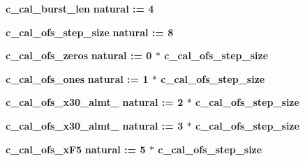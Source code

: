\begin{DoxyCompactItemize}
\item 
{\bf c\+\_\+cal\+\_\+burst\+\_\+len} {\bfseries \textcolor{comment}{natural}\textcolor{vhdlchar}{ }\textcolor{vhdlchar}{ }\textcolor{vhdlchar}{\+:}\textcolor{vhdlchar}{=}\textcolor{vhdlchar}{ }\textcolor{vhdlchar}{ } \textcolor{vhdldigit}{4} \textcolor{vhdlchar}{ }} 
\item 
{\bf c\+\_\+cal\+\_\+ofs\+\_\+step\+\_\+size} {\bfseries \textcolor{comment}{natural}\textcolor{vhdlchar}{ }\textcolor{vhdlchar}{ }\textcolor{vhdlchar}{\+:}\textcolor{vhdlchar}{=}\textcolor{vhdlchar}{ }\textcolor{vhdlchar}{ } \textcolor{vhdldigit}{8} \textcolor{vhdlchar}{ }} 
\item 
{\bf c\+\_\+cal\+\_\+ofs\+\_\+zeros} {\bfseries \textcolor{comment}{natural}\textcolor{vhdlchar}{ }\textcolor{vhdlchar}{ }\textcolor{vhdlchar}{\+:}\textcolor{vhdlchar}{=}\textcolor{vhdlchar}{ }\textcolor{vhdlchar}{ } \textcolor{vhdldigit}{0} \textcolor{vhdlchar}{$\ast$}\textcolor{vhdlchar}{ }\textcolor{vhdlchar}{ }\textcolor{vhdlchar}{ }{\bfseries {\bf c\+\_\+cal\+\_\+ofs\+\_\+step\+\_\+size}} \textcolor{vhdlchar}{ }} 
\item 
{\bf c\+\_\+cal\+\_\+ofs\+\_\+ones} {\bfseries \textcolor{comment}{natural}\textcolor{vhdlchar}{ }\textcolor{vhdlchar}{ }\textcolor{vhdlchar}{\+:}\textcolor{vhdlchar}{=}\textcolor{vhdlchar}{ }\textcolor{vhdlchar}{ } \textcolor{vhdldigit}{1} \textcolor{vhdlchar}{$\ast$}\textcolor{vhdlchar}{ }\textcolor{vhdlchar}{ }\textcolor{vhdlchar}{ }{\bfseries {\bf c\+\_\+cal\+\_\+ofs\+\_\+step\+\_\+size}} \textcolor{vhdlchar}{ }} 
\item 
{\bf c\+\_\+cal\+\_\+ofs\+\_\+x30\+\_\+almt\+\_} {\bfseries \textcolor{comment}{natural}\textcolor{vhdlchar}{ }\textcolor{vhdlchar}{ }\textcolor{vhdlchar}{\+:}\textcolor{vhdlchar}{=}\textcolor{vhdlchar}{ }\textcolor{vhdlchar}{ } \textcolor{vhdldigit}{2} \textcolor{vhdlchar}{$\ast$}\textcolor{vhdlchar}{ }\textcolor{vhdlchar}{ }\textcolor{vhdlchar}{ }{\bfseries {\bf c\+\_\+cal\+\_\+ofs\+\_\+step\+\_\+size}} \textcolor{vhdlchar}{ }} 
\item 
{\bf c\+\_\+cal\+\_\+ofs\+\_\+x30\+\_\+almt\+\_} {\bfseries \textcolor{comment}{natural}\textcolor{vhdlchar}{ }\textcolor{vhdlchar}{ }\textcolor{vhdlchar}{\+:}\textcolor{vhdlchar}{=}\textcolor{vhdlchar}{ }\textcolor{vhdlchar}{ } \textcolor{vhdldigit}{3} \textcolor{vhdlchar}{$\ast$}\textcolor{vhdlchar}{ }\textcolor{vhdlchar}{ }\textcolor{vhdlchar}{ }{\bfseries {\bf c\+\_\+cal\+\_\+ofs\+\_\+step\+\_\+size}} \textcolor{vhdlchar}{ }} 
\item 
{\bf c\+\_\+cal\+\_\+ofs\+\_\+x\+F5} {\bfseries \textcolor{comment}{natural}\textcolor{vhdlchar}{ }\textcolor{vhdlchar}{ }\textcolor{vhdlchar}{\+:}\textcolor{vhdlchar}{=}\textcolor{vhdlchar}{ }\textcolor{vhdlchar}{ } \textcolor{vhdldigit}{5} \textcolor{vhdlchar}{$\ast$}\textcolor{vhdlchar}{ }\textcolor{vhdlchar}{ }\textcolor{vhdlchar}{ }{\bfseries {\bf c\+\_\+cal\+\_\+ofs\+\_\+step\+\_\+size}} \textcolor{vhdlchar}{ }} 

\end{DoxyCompactItemize}

